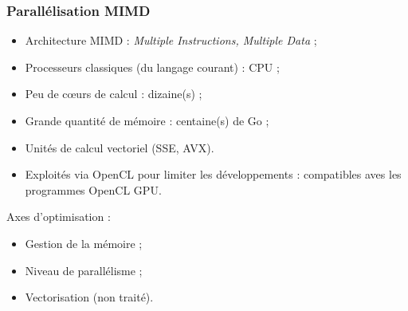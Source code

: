 \begin{frame}
\frametitle{Parallélisation MIMD}
\vfill
\begin{itemize}
\item Architecture MIMD : \textit{Multiple Instructions, Multiple Data} ;
\item Processeurs classiques (du langage courant) : CPU ;
\item Peu de cœurs de calcul : dizaine(s) ;
\item Grande quantité de mémoire : centaine(s) de Go ;
\item Unités de calcul vectoriel (SSE, AVX).
\item Exploités via OpenCL pour limiter les développements : compatibles aves les programmes OpenCL GPU.
\end{itemize}
\vfill
Axes d'optimisation :
\begin{itemize}
\item Gestion de la mémoire ;
\item Niveau de parallélisme ;
\item Vectorisation (non traité).
\end{itemize}
\vfill
\end{frame}

